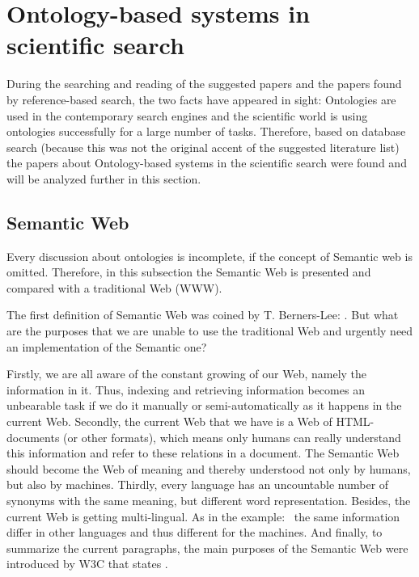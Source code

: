 \section{Ontology-based systems in scientific search}
During the searching and reading of the suggested papers and the papers found by reference-based search, the two facts have appeared in sight: Ontologies are used in the contemporary search engines and the scientific world is using ontologies successfully for a large number of tasks. Therefore, based on database search (because this was not the original accent of the suggested literature list) the papers about Ontology-based systems in the scientific search were found and will be analyzed further in this section.
		\subsection{Semantic Web}
		\label{sec:SemWeb}
		Every discussion about ontologies is incomplete, if the concept of Semantic web is omitted. Therefore, in this subsection the Semantic Web is presented and compared with a traditional Web (WWW).
		
		The first definition of Semantic Web was coined by T. Berners-Lee: \frqq\cite{Ber01}. But what are the purposes that we are unable to use the traditional Web and urgently need an implementation of the Semantic one? 
		
		Firstly, we are all aware of the constant growing of our Web, namely the information in it. Thus, indexing and retrieving information becomes an unbearable task if we do it manually or semi-automatically as it happens in the current Web. Secondly, the current Web that we have is a Web of HTML-documents (or other formats), which means only humans can really understand this information and refer to these relations in a document. The Semantic Web should become the Web of meaning and thereby understood not only by humans, but also by machines. Thirdly, every language has an uncountable number of synonyms with the same meaning, but different word representation. Besides, the current Web is getting multi-lingual. As in the example: \frqq\cite{Raj14} \ the same information differ in other languages and thus different for the machines. And finally, to summarize the current paragraphs, the main purposes of the Semantic Web were introduced by W3C that states \frqq\cite{w3c01}.
		
